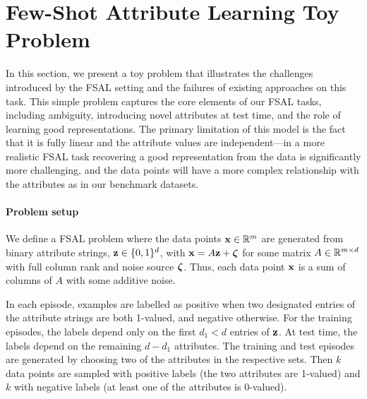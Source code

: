 \section{Few-Shot Attribute Learning Toy Problem}
\label{app:toy_problem}

In this section, we present a toy problem that illustrates the challenges introduced by the FSAL setting and the failures of existing approaches on this task. This simple problem
captures the core elements of our FSAL tasks, including ambiguity, introducing novel attributes at test time, and the role of learning good representations. The primary limitation of this
model is the fact that it is fully linear and the attribute values are independent---in a more
realistic FSAL task recovering a good representation from the data is significantly more
challenging, and the data points will have a more complex relationship with the attributes as in our
benchmark datasets.

\paragraph{Problem setup} We define a FSAL problem where the data points $\mathbf{x}
\in \mathbb{R}^{m}$ are generated from binary attribute strings, $\mathbf{z} \in \{0, 1\}^d$, with $\mathbf{x} = A \mathbf{z} +
\boldsymbol{\zeta}$ for some matrix $A \in \mathbb{R}^{m \times d}$ with full column rank and noise source $\boldsymbol{\zeta}$.
Thus, each data point $\mathbf{x}$ is a sum of columns of $A$ with some additive noise.

In each episode, examples are labelled as positive when two designated entries of the attribute strings are both 1-valued,
and negative otherwise. For the training episodes, the labels depend only on the first $d_1 < d$
entries of $\mathbf{z}$. At test time, the labels depend on the remaining $d -d_1$ attributes. The training and test
episodes are generated by choosing two of the attributes in the respective sets. Then $k$ data points are sampled with positive labels (the two attributes are 1-valued) and $k$ with negative labels (at least one of the attributes is
0-valued).

